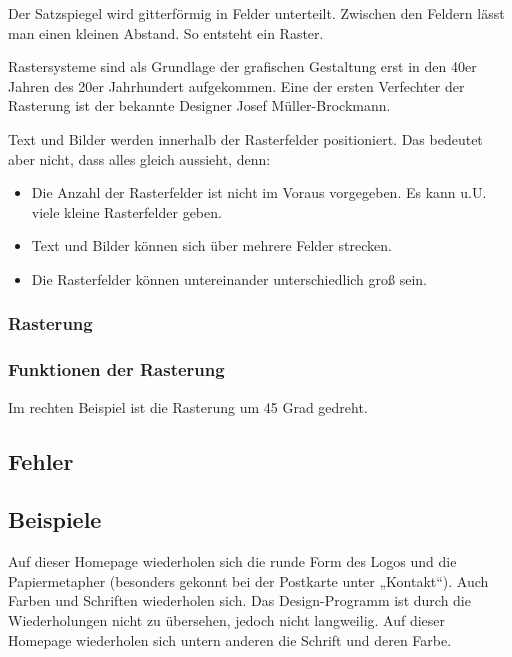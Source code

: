Der Satzspiegel wird gitterförmig in Felder unterteilt. Zwischen den Feldern lässt man einen kleinen Abstand.  So entsteht ein Raster.
 
Rastersysteme sind als Grundlage der grafischen Gestaltung erst in den 40er Jahren des 20er Jahrhundert aufgekommen. Eine der ersten Verfechter der Rasterung ist der bekannte Designer Josef Müller-Brockmann.

Text und Bilder werden innerhalb der Rasterfelder positioniert. Das bedeutet aber nicht, dass alles gleich aussieht, denn:
\begin{itemize}
\item Die Anzahl der Rasterfelder ist nicht im Voraus vorgegeben. Es kann u.U. viele kleine Rasterfelder geben.
\item Text und Bilder können sich über mehrere Felder strecken.
\item Die Rasterfelder können untereinander unterschiedlich groß sein.
\end{itemize}
\subsubsection{Rasterung}
\subsubsection{Funktionen der Rasterung}
Im rechten Beispiel ist die Rasterung um 45 Grad gedreht.

\subsection{Fehler}

\subsection{Beispiele}
Auf dieser Homepage wiederholen sich die runde Form des Logos und die Papiermetapher (besonders gekonnt bei der Postkarte unter „Kontakt“). Auch Farben und Schriften wiederholen sich. Das Design-Programm ist durch die Wiederholungen nicht zu übersehen, jedoch nicht langweilig.
Auf dieser Homepage wiederholen sich untern anderen die Schrift und deren Farbe.

